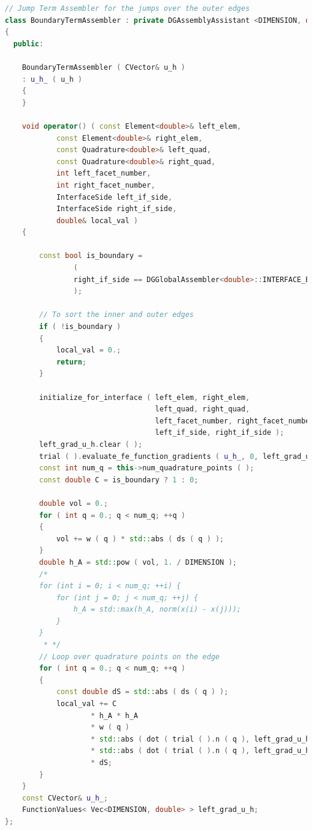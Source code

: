 \documentclass[a4paper, 11pt, twoside]{article}
\begin{document}
\begin{lstlisting}[language=C++, basicstyle={\footnotesize, \ttfamily}, keywordstyle=\color{blue}, numbers=none, tabsize=4]
// Jump Term Assembler for the jumps over the outer edges
class BoundaryTermAssembler : private DGAssemblyAssistant <DIMENSION, double>
{
  public:

    BoundaryTermAssembler ( CVector& u_h )
    : u_h_ ( u_h )
    {
    }

    void operator() ( const Element<double>& left_elem,
            const Element<double>& right_elem,
            const Quadrature<double>& left_quad,
            const Quadrature<double>& right_quad,
            int left_facet_number,
            int right_facet_number,
            InterfaceSide left_if_side,
            InterfaceSide right_if_side,
            double& local_val )
    {

        const bool is_boundary =
                (
                right_if_side == DGGlobalAssembler<double>::INTERFACE_BOUNDARY
                );

        // To sort the inner and outer edges
        if ( !is_boundary )
        {
            local_val = 0.;
            return;
        }

        initialize_for_interface ( left_elem, right_elem,
                                   left_quad, right_quad,
                                   left_facet_number, right_facet_number,
                                   left_if_side, right_if_side );
        left_grad_u_h.clear ( );
        trial ( ).evaluate_fe_function_gradients ( u_h_, 0, left_grad_u_h );
        const int num_q = this->num_quadrature_points ( );
        const double C = is_boundary ? 1 : 0;

        double vol = 0.;
        for ( int q = 0.; q < num_q; ++q )
        {
            vol += w ( q ) * std::abs ( ds ( q ) );
        }
        double h_A = std::pow ( vol, 1. / DIMENSION );
        /*
        for (int i = 0; i < num_q; ++i) {
            for (int j = 0; j < num_q; ++j) {
                h_A = std::max(h_A, norm(x(i) - x(j)));
            }
        }
         * */
        // Loop over quadrature points on the edge
        for ( int q = 0.; q < num_q; ++q )
        {
            const double dS = std::abs ( ds ( q ) );
            local_val += C
                    * h_A * h_A
                    * w ( q )
                    * std::abs ( dot ( trial ( ).n ( q ), left_grad_u_h[q] ) )
                    * std::abs ( dot ( trial ( ).n ( q ), left_grad_u_h[q] ) )
                    * dS;
        }
    }
    const CVector& u_h_;
    FunctionValues< Vec<DIMENSION, double> > left_grad_u_h;
};
\end{lstlisting}
\end{document}
